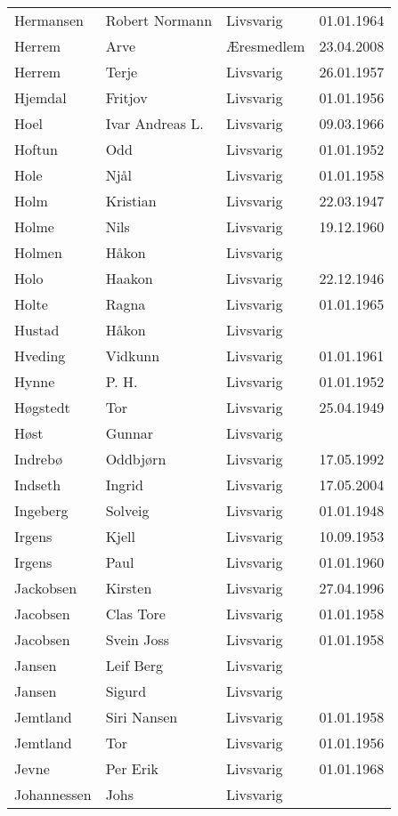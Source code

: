 \begin{longtable}{llll}
Hermansen	&	Robert Normann	&	Livsvarig 	&	01.01.1964	\\
Herrem	&	Arve	&	Æresmedlem	&	23.04.2008	\\
Herrem	&	Terje	&	Livsvarig 	&	26.01.1957	\\
Hjemdal	&	Fritjov	&	Livsvarig 	&	01.01.1956	\\
Hoel	&	Ivar Andreas L.	&	Livsvarig 	&	09.03.1966	\\
Hoftun	&	Odd	&	Livsvarig 	&	01.01.1952	\\
Hole	&	Njål	&	Livsvarig 	&	01.01.1958	\\
Holm	&	Kristian	&	Livsvarig 	&	22.03.1947	\\
Holme	&	Nils	&	Livsvarig 	&	19.12.1960	\\
Holmen	&	Håkon	&	Livsvarig 	&		\\
Holo	&	Haakon	&	Livsvarig 	&	22.12.1946	\\
Holte	&	Ragna	&	Livsvarig 	&	01.01.1965	\\
Hustad	&	Håkon	&	Livsvarig 	&		\\
Hveding	&	Vidkunn	&	Livsvarig 	&	01.01.1961	\\
Hynne	&	P. H. 	&	Livsvarig 	&	01.01.1952	\\
Høgstedt	&	Tor	&	Livsvarig 	&	25.04.1949	\\
Høst	&	Gunnar	&	Livsvarig 	&		\\
Indrebø	&	Oddbjørn	&	Livsvarig 	&	17.05.1992	\\
Indseth 	&	Ingrid	&	Livsvarig	&	17.05.2004	\\
Ingeberg	&	Solveig	&	Livsvarig 	&	01.01.1948	\\
Irgens	&	Kjell	&	Livsvarig 	&	10.09.1953	\\
Irgens	&	Paul	&	Livsvarig 	&	01.01.1960	\\
Jackobsen 	&	Kirsten	&	Livsvarig	&	27.04.1996	\\
Jacobsen	&	Clas Tore	&	Livsvarig 	&	01.01.1958	\\
Jacobsen	&	Svein Joss	&	Livsvarig 	&	01.01.1958	\\
Jansen	&	Leif Berg	&	Livsvarig 	&		\\
Jansen	&	Sigurd	&	Livsvarig 	&		\\
Jemtland	&	Siri Nansen	&	Livsvarig 	&	01.01.1958	\\
Jemtland	&	Tor	&	Livsvarig 	&	01.01.1956	\\
Jevne	&	Per Erik	&	Livsvarig 	&	01.01.1968	\\
Johannessen	&	Johs	&	Livsvarig 	&		\\

\end{longtable}
